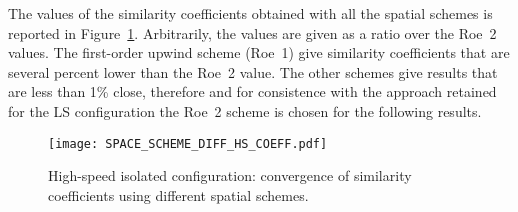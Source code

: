 The values of the similarity coefficients obtained with
all the spatial schemes is reported in 
Figure~\ref{fig:dream_hs_space_scheme_coeff}. Arbitrarily, the values are
given as a ratio over the Roe~2 values. The first-order
upwind scheme (Roe~1) give similarity coefficients that are
several percent lower than the Roe~2 value. The other schemes
give results that are less than 1\% close, therefore and for
consistence with the approach retained for the LS configuration
the Roe~2 scheme is chosen for the following results.
\begin{figure}[htp]
  \centering
  \texttt{[image: SPACE\_SCHEME\_DIFF\_HS\_COEFF.pdf]}
  \caption{High-speed isolated configuration: convergence of 
  similarity coefficients using different spatial schemes.}
  \label{fig:dream_hs_space_scheme_coeff}
\end{figure}

